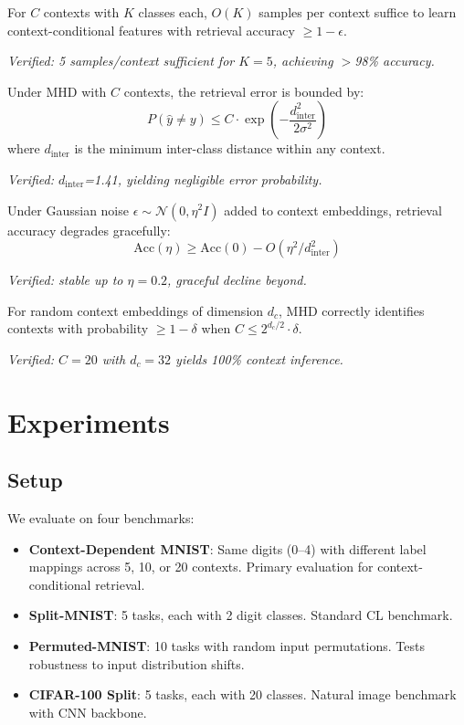 \documentclass[letterpaper, 10pt, times]{article}
\begin{document}
\begin{theorem}
\label{thm:sample}
For $C$ contexts with $K$ classes each, $O(K)$ samples per context suffice to learn context-conditional features with retrieval accuracy $\geq 1 - \epsilon$.
\end{theorem}
\emph{Verified: 5 samples/context sufficient for $K=5$, achieving $>$98\% accuracy.}

\begin{theorem}
\label{thm:retrieval}
Under MHD with $C$ contexts, the retrieval error is bounded by:
\begin{equation}
P(\hat{y} \neq y) \leq C \cdot \exp\left(-\frac{d_{\text{inter}}^2}{2\sigma^2}\right)
\end{equation}
where $d_{\text{inter}}$ is the minimum inter-class distance within any context.
\end{theorem}
\emph{Verified: $d_{\text{inter}}$=1.41, yielding negligible error probability.}

\begin{theorem}
\label{thm:noise}
Under Gaussian noise $\epsilon \sim \mathcal{N}(0, \eta^2 I)$ added to context embeddings, retrieval accuracy degrades gracefully:
\begin{equation}
\text{Acc}(\eta) \geq \text{Acc}(0) - O(\eta^2 / d_{\text{inter}}^2)
\end{equation}
\end{theorem}
\emph{Verified: stable up to $\eta=0.2$, graceful decline beyond.}

\begin{theorem}
\label{thm:capacity}
For random context embeddings of dimension $d_c$, MHD correctly identifies contexts with probability $\geq 1 - \delta$ when $C \leq 2^{d_c/2} \cdot \delta$.
\end{theorem}
\emph{Verified: $C=20$ with $d_c=32$ yields 100\% context inference.}

\section{Experiments}

\subsection{Setup}

We evaluate on four benchmarks:
\begin{itemize}
\item \textbf{Context-Dependent MNIST}: Same digits (0--4) with different label mappings across 5, 10, or 20 contexts. Primary evaluation for context-conditional retrieval.
\item \textbf{Split-MNIST}: 5 tasks, each with 2 digit classes. Standard CL benchmark.
\item \textbf{Permuted-MNIST}: 10 tasks with random input permutations. Tests robustness to input distribution shifts.
\item \textbf{CIFAR-100 Split}: 5 tasks, each with 20 classes. Natural image benchmark with CNN backbone.
\end{itemize}
\end{document}
